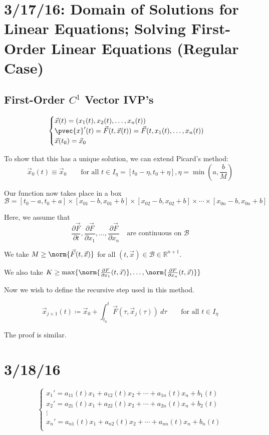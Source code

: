 \documentclass[12pt]{article}
\begin{document}
\section{3/17/16: Domain of Solutions for Linear Equations; Solving First-Order Linear Equations (Regular Case)}

\subsection{First-Order $C^1$ Vector IVP's}
\[ 
\begin{cases}
\vec{x}(t) = (x_1(t), x_2(t), \dots, x_n(t)) \\
\pvec{x}'(t) = \vec{F}(t,\vec{x}(t)) = \vec{F}(t,x_1(t),\dots,x_n(t)) \\
\vec{x}(t_0) = \vec{x}_0 \\
\end{cases}
\]

To show that this has a unique solution, we can extend Picard's method:
\[ \vec{x}_0(t) \equiv \vec{x}_0 \qquad \text{for all } t \in I_{\eta} = [t_0 - \eta, t_0 + \eta], \eta = \min\left(a,\frac{b}{M}\right) \]

Our function now takes place in a box \[ \mathcal{B} = [t_0-a,t_0+a] \times [x_{01} - b,x_{01} + b] \times [x_{02} - b, x_{02} + b] \times \cdots \times [x_{0n} - b,x_{0n} + b] \]

Here, we assume that \[ \frac{\partial \vec{F}}{\partial t}, \frac{\partial \vec{F}}{\partial x_1}, \dots, \frac{\partial \vec{F}}{\partial x_n} \quad \text{are continuous on } \mathcal{B} \]

We take $M \ge \norm{\vec{F}(t,\vec{x})}$ for all $(t,\vec{x}) \in \mathcal{B} \in \mathbb{R}^{n+1}$.

We also take $K \ge \max\{\norm{\frac{\partial F}{\partial x_1}(t,\vec{x})}, \dots, \norm{\frac{\partial F}{\partial x_n}(t,\vec{x})} \} $

Now we wish to define the recursive step used in this method.

\[ \vec{x}_{j+1}(t) \coloneqq \vec{x}_0 + \int_{t_0}^t \vec{F}(\tau, \vec{x}_j(\tau)) \ d\tau \qquad \text{for all } t \in I_{\eta} \]

The proof is similar.

\section{3/18/16}

\[ 
\begin{cases}
x_1' = a_{11}(t)x_1 + a_{12}(t)x_2 + \cdots + a_{1n}(t)x_n + b_1(t) \\
x_2' = a_{21}(t)x_1 + a_{22}(t)x_2 + \cdots + a_{2n}(t)x_n + b_2(t) \\
\vdots \\
x_n' = a_{n1}(t)x_1 + a_{n2}(t)x_2 + \cdots + a_{nn}(t)x_n + b_n(t) \\
\end{cases}
\]
\end{document}
